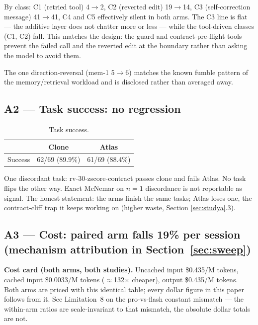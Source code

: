 \documentclass[11pt]{article}
\begin{document}
By class: C1 (retried tool) 4$\rightarrow$2, C2 (reverted edit) 19$\rightarrow$14, C3 (self-correction message) 41$\rightarrow$41, C4 and C5 effectively silent in both arms. The C3 line is flat --- the additive layer does not chatter more or less --- while the tool-driven classes (C1, C2) fall. This matches the design: the guard and contract-pre-flight tools prevent the failed call and the reverted edit at the boundary rather than asking the model to avoid them.

The one direction-reversal (mem-1 5$\rightarrow$6) matches the known fumble pattern of the memory/retrieval workload and is disclosed rather than averaged away.

\subsection{A2 --- Task success: no regression}

\begin{table}[h]
\centering
\begin{tabular}{@{}lcc@{}}
\toprule
 & Clone & Atlas \\
\midrule
Success & 62/69 (89.9\%) & 61/69 (88.4\%) \\
\bottomrule
\end{tabular}
\caption{Task success.}
\label{tab:succ}
\end{table}

One discordant task: rv-30-zscore-contract passes clone and fails Atlas. No task flips the other way. Exact McNemar on $n=1$ discordance is not reportable as signal. The honest statement: the arms finish the same tasks; Atlas loses one, the contract-cliff trap it keeps working on (higher waste, Section \ref{sec:studya}.3).

\subsection{A3 --- Cost: paired arm falls 19\% per session (mechanism attribution in Section~\ref{sec:sweep})}

\textbf{Cost card (both arms, both studies).} Uncached input \$0.435/M tokens, cached input \$0.0033/M tokens ($\approx$132$\times$ cheaper), output \$0.435/M tokens. Both arms are priced with this identical table; every dollar figure in this paper follows from it. See Limitation~8 on the pro-vs-flash constant mismatch --- the within-arm ratios are scale-invariant to that mismatch, the absolute dollar totals are not.
\end{document}
